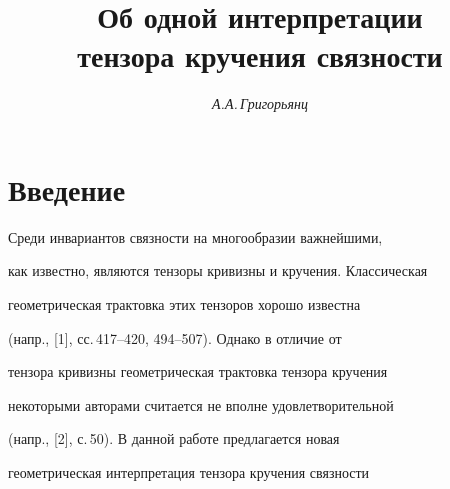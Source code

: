 



\author{\it А.А.\,Григорьянц} 




\title{Об одной интерпретации \\ 


тензора кручения связности} 


 


\date{} 




 


\pagestyle{plain} %


 


 




 


\maketitle 


\label{begin} 


 


 


\section{Введение} 


 


Среди инвариантов связности на многообразии важнейшими, 


как известно, являются тензоры кривизны и кручения. Классическая  


геометрическая трактовка этих тензоров хорошо известна 


(напр., [1], сс.\,417--420, 494--507). Однако в отличие от 


тензора кривизны геометрическая трактовка тензора кручения 


некоторыми авторами считается не вполне удовлетворительной 


(напр., [2], с.\,50). В данной работе предлагается новая  


геометрическая интерпретация тензора кручения связности 


